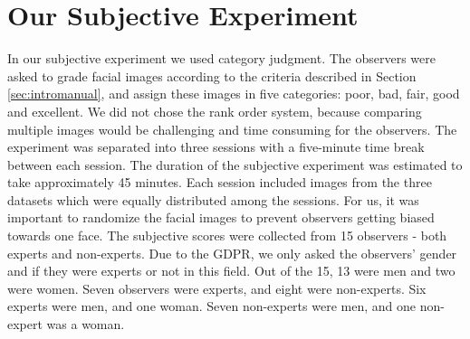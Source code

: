 \begin{table}[h]
\caption{Information about all datasets used in the project.}
\label{table:DatasetInformation}
\end{table}

\section{Our Subjective Experiment}
\label{sec:OurSubjectiveExperiment}
In our subjective experiment we used category judgment. The observers were asked to grade facial images according to the criteria described in Section \ref{sec:intromanual}, and assign these images in five categories: poor, bad, fair, good and excellent. We did not chose the rank order system, because comparing multiple images would be challenging and time consuming for the observers. The experiment was separated into three sessions with a five-minute time break between each session. The duration of the subjective experiment was estimated to take approximately 45 minutes. Each session included images from the three datasets which were equally distributed among the sessions. For us, it was important to randomize the facial images to prevent observers getting biased towards one face. The subjective scores were collected from 15 observers - both experts and non-experts. Due to the GDPR, we only asked the observers' gender and if they were experts or not in this field. Out of the 15, 13 were men and two were women. Seven observers were experts, and eight were non-experts. Six experts were men, and one woman. Seven non-experts were men, and one non-expert was a woman. 
%
